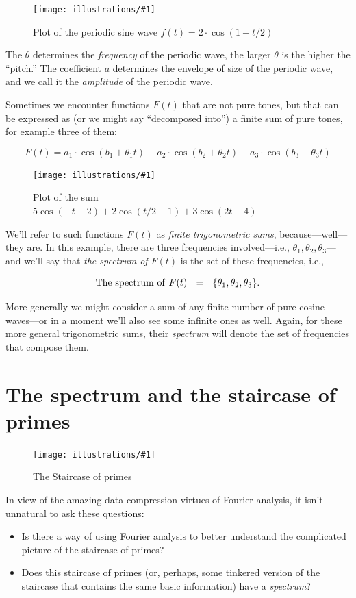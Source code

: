 \documentclass[openany]{book}
\newcommand{\ill}[3]{%
   \begin{figure}[H]%
   \vspace{-2ex}
   \centering%
   \texttt{[image: illustrations/\#1]}%
   \caption{#3}%
   \vspace{-2ex}
    \end{figure}}
\theoremstyle{plain}
\theoremstyle{definition}
\begin{document}
{\ill{pure_tone}{.7}{Plot of the periodic sine wave $f(t) = 2\cdot \cos(1+t/2)$}

The $\theta$ determines the {\it frequency} of the periodic wave, the
larger $\theta$ is the higher the ``pitch.''  The coefficient $a$
determines the envelope of size of the periodic wave, and we call it
the {\it amplitude} of the periodic wave.

Sometimes we encounter functions $F(t)$ that are not pure tones, but
that can be expressed as (or we might say ``decomposed into'') a finite
sum of pure tones, for example three of them:

$$F(t)  = a_1\cdot \cos(b_1 +\theta_1 t) + a_2\cdot \cos(b_2 +\theta_2 t) + a_3\cdot \cos(b_3 +\theta_3 t)$$

\ill{mixed_tone3}{.7}{Plot of the sum $5  \cos\left(-t - 2\right) + 2 \cos\left(t/2 + 1\right) + 3  \cos\left(2  t + 4\right)$}

We'll refer to such functions $F(t)$ as {\it finite trigonometric
  sums}, because---well---they are.  In this example, there are three
frequencies involved---i.e., $\theta_1,\theta_2,\theta_3$---and we'll
say that {\it the spectrum of $F(t)$} is the set of these frequencies,
i.e.,

$$
  {\rm The\ spectrum \ of \ } F(t) \ \ = \ \ \{\theta_1,\theta_2,\theta_3\}.
$$

More generally we might consider a sum of any finite number of pure
cosine waves---or in a moment we'll also see some infinite ones as
well. Again, for these more general trigonometric sums, their {\it
  spectrum} will denote the set of frequencies that compose them.

\chapter{The spectrum and the staircase of primes\label{sec:fourier_staircase}}

\ill{prime_pi_100_aspect1}{0.95}{The Staircase of primes\label{fig:staircase100}}


In view of the amazing data-compression virtues of Fourier analysis,
it isn't unnatural to ask these questions:

\begin{itemize}
\item Is there a way of using Fourier analysis to better understand
  the complicated picture of the staircase of primes?

\item Does this staircase of primes (or, perhaps, some tinkered
  version of the staircase that contains the same basic information)
  have a {\it spectrum}?


\end{itemize}}
\end{document}
